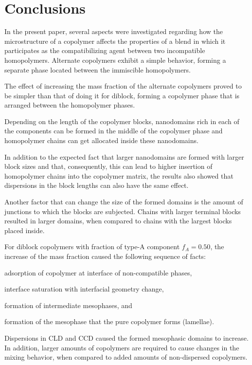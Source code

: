 \documentclass[
journal=mamobx,
manuscript=article,
]{achemso}
\begin{document}
\section{Conclusions}
\label{sec:conclusions}

In the present paper, several aspects were investigated regarding how the microstructure of a copolymer affects the properties of a blend in which it participates as the compatibilizing agent between two incompatible homopolymers.
Alternate copolymers exhibit a simple behavior, forming a separate phase located between the immiscible homopolymers.

The effect of increasing the mass fraction of the alternate copolymers proved to be simpler than that of doing it for diblock, forming a copolymer phase that is arranged between the homopolymer phases.

Depending on the length of the copolymer blocks, nanodomains rich in each of the components can be formed in the middle of the copolymer phase and homopolymer chains can get allocated inside these nanodomains.

In addition to the expected fact that larger nanodomains are formed with larger block sizes and that, consequently, this can lead to higher insertion of homopolymer chains into the copolymer matrix, the results also showed that dispersions in the block lengths can also have the same effect.

Another factor that can change the size of the formed domains is the amount of junctions to which the blocks are subjected. Chains with larger terminal blocks resulted in larger domains, when compared to chains with the largest blocks placed inside.

For diblock copolymers with fraction of type-A component $f_A=0.50$, the increase of the mass fraction caused the following sequence of facts: \begin{enumerate*}[label=\roman*)] \item adsorption of copolymer at interface of non-compatible phases, \item interface saturation with interfacial geometry change, \item formation of intermediate mesophases, and \item formation of the mesophase that the pure copolymer forms (lamellae).\end{enumerate*}

Dispersions in CLD and CCD caused the formed mesophasic domains to increase. In addition, larger amounts of copolymers are required to cause changes in the mixing behavior, when compared to added amounts of non-dispersed copolymers.
\end{document}
